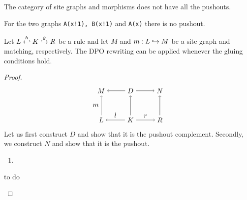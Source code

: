 The category of site graphs and morphisms does not have all the pushouts. %

\begin{example}
  For the two graphs \verb|A(x!1), B(x!1)| and \verb|A(x)| there is no pushout.
\end{example}


\begin{lemma}
  Let $L\overset{h}{\hookleftarrow} K \overset{g}{\hookrightarrow} R$ be a rule and let $M$ and $m:L\hookrightarrow M$ be a site graph and matching, respectively. The DPO rewriting can be applied whenever the gluing conditions hold.
\end{lemma}
\begin{proof}
  \[
  \begin{tikzpicture} %
    \node (l) at (-1.5,0) {\(L\)};
    \node (d) at (0,0) {\(K\)};
    \node (r) at (1.5,0) {\(R\)};
    \node (m) at (-1.5,1.5) {\(M\)};
    \node (d') at (0,1.5) {\(D\)};
    \node (n) at (1.5,1.5) {\(N\)};
    \draw [->] (d) -- node [above,midway] {\(l\)} (l);
    \draw [->] (d) -- node [above,midway] {\(r\)} (r);
    \draw [->] (d') -- (m);
    \draw [->] (d') -- (n);
    \draw [->] (l) -- node [left,midway] {\(m\)}  (m);
    \draw [->] (d) -- (d');
    \draw [->] (r) -- (n);
  \end{tikzpicture}
  \]
  Let us first construct $D$ and show that it is the pushout complement. Secondly, we construct $N$ and show that it is the pushout.
  \begin{enumerate}
  \item


  \end{enumerate}

  \begin{mdframed}[backgroundcolor=blue!20]
    to do
  \end{mdframed}
\end{proof}
